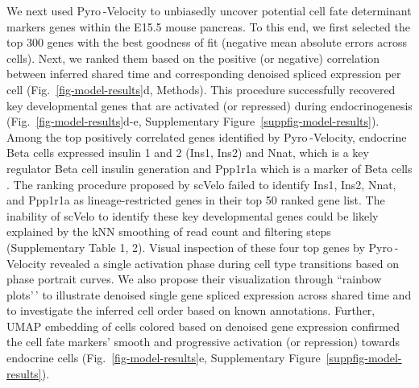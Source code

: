 \documentclass[
  sn-mathphys-num,
  lineno,
  twocolumn]{sn-jnl}
\begin{document}
We next used Pyro -Velocity to unbiasedly uncover potential cell fate
determinant markers genes within the E15.5 mouse pancreas. To this end,
we first selected the top 300 genes with the best goodness of fit
(negative mean absolute errors across cells). Next, we ranked them based
on the positive (or negative) correlation between inferred shared time
and corresponding denoised spliced expression per cell
(Fig.~\ref{fig-model-results}d, Methods). This procedure successfully
recovered key developmental genes that are activated (or repressed)
during endocrinogenesis (Fig.~\ref{fig-model-results}d-e,
Supplementary Figure~\ref{suppfig-model-results}). Among the top
positively correlated genes identified by Pyro -Velocity, endocrine Beta
cells expressed insulin 1 and 2 (Ins1, Ins2) and Nnat, which is a key
regulator Beta cell insulin generation \citep{Millership2018-vd} and
Ppp1r1a which is a marker of Beta cells \citep{Jiang2013-pt}. The
ranking procedure proposed by scVelo failed to identify Ins1, Ins2,
Nnat, and Ppp1r1a as lineage-restricted genes in their top 50 ranked
gene list. The inability of scVelo to identify these key developmental
genes could be likely explained by the kNN smoothing of read count and
filtering steps (Supplementary Table 1, 2). Visual inspection of these
four top genes by Pyro -Velocity revealed a single activation phase
during cell type transitions based on phase portrait curves. We also
propose their visualization through ``rainbow plots'\,' to illustrate
denoised single gene spliced expression across shared time and to
investigate the inferred cell order based on known annotations. Further,
UMAP embedding of cells colored based on denoised gene expression
confirmed the cell fate markers' smooth and progressive activation (or
repression) towards endocrine cells (Fig.~\ref{fig-model-results}e,
Supplementary Figure~\ref{suppfig-model-results}).
\end{document}
